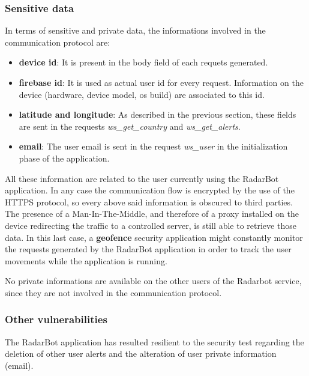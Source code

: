 		\subsubsection{Sensitive data}
			\par In terms of sensitive and private data, the informations involved in the communication protocol are:
			\begin{itemize}
				\item \textbf{device id}: It is present in the body field of each requets generated.
				\item \textbf{firebase id}: It is used as actual user id for every request. Information on the device (hardware, device model, os build) are associated to this id.
				\item \textbf{latitude and longitude}: As described in the previous section, these fields are sent in the requests \textit{ws\_get\_country} and \textit{ws\_get\_alerts}. 
				\item \textbf{email}: The user email is sent in the request \textit{ws\_user} in the initialization phase of the application.
			\end{itemize}
			\par All these information are related to the user currently using the RadarBot application. In any case the communication flow is encrypted by the use of the HTTPS protocol, so every above said information is obscured to third parties. The presence of a Man-In-The-Middle, and therefore of a proxy installed on the device redirecting the traffic to a controlled server, is still able to retrieve those data.\newline
			In this last case, a \textbf{geofence} security application might constantly monitor the requests generated by the RadarBot application in order to track the user movements while the application is running.\newline
			\par No private informations are available on the other users of the Radarbot service, since they are not involved in the communication protocol.
			
		\subsubsection{Other vulnerabilities}
			\par The RadarBot application has resulted resilient to the security test regarding the deletion of other user alerts and the alteration of user private information (email).
		